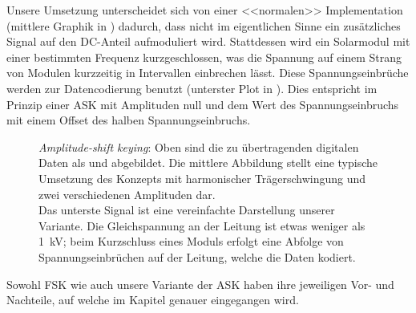 Unsere  Umsetzung unterscheidet  sich  von  einer <<normalen>>   Implementation
(mittlere   Graphik  in   )  dadurch,   dass  nicht   im
eigentlichen Sinne  ein zus\"atzliches  Signal auf den  DC-Anteil aufmoduliert
wird. Stattdessen   wird  ein   Solarmodul  mit   einer  bestimmten   Frequenz
kurzgeschlossen,  was die  Spannung auf  einem Strang  von Modulen  kurzzeitig
in  Intervallen  einbrechen  l\"asst. Diese  Spannungseinbr\"uche  werden  zur
Datencodierung  benutzt   (unterster  Plot   in  ). Dies
entspricht  im  Prinzip  einer  ASK  mit Amplituden  null  und  dem  Wert  des
Spannungseinbruchs mit einem Offset des halben Spannungseinbruchs.


\begin{figure}[h!tb]
    \centering
    
    \caption{%
        \emph{Amplitude-shift  keying}: Oben   sind  die   zu  \"ubertragenden
        digitalen  Daten als   und   abgebildet. Die  mittlere
        Abbildung stellt eine typische Umsetzung des Konzepts mit harmonischer
        Tr\"agerschwingung und zwei verschiedenen Amplituden dar.\protect\\
        Das  unterste   Signal  ist  eine  vereinfachte   Darstellung  unserer
        Variante.  Die  Gleichspannung an  der Leitung  ist etwas  weniger als
        \SI{1}{\kilo\volt}; beim Kurzschluss eines Moduls erfolgt eine Abfolge
        von Spannungseinbr\"uchen auf der Leitung, welche die Daten kodiert.%
    }
    \label{fig:ask:concept}
\end{figure}


Sowohl  FSK wie  auch  unsere  Variante der  ASK  haben  ihre jeweiligen  Vor-
und  Nachteile,  auf  welche im  Kapitel  \emph{}  genauer
eingegangen wird.
